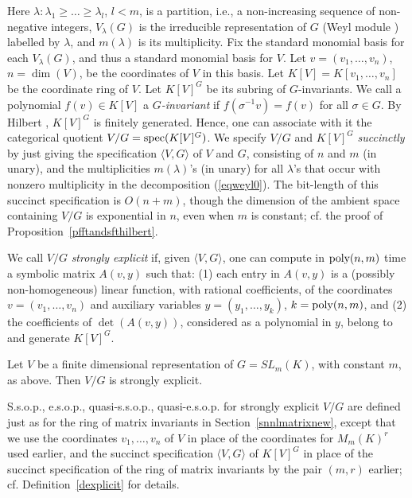 \documentclass[11pt]{article}
\begin{document}
Here $\lambda:\lambda_1 \ge \ldots \ge \lambda_l$, $l <m$, is a partition, i.e., a 
non-increasing sequence
of non-negative integers,  $V_\lambda(G)$ is the irreducible representation of $G$
(Weyl module \cite{fultonrepr}) labelled by $\lambda$, and $m(\lambda)$ is its multiplicity.
Fix the  standard monomial basis \cite{doubillet,raghavan} for each $V_\lambda(G)$, and thus a standard monomial basis for $V$.
Let $v=(v_1,\ldots,v_n)$, $n=\dim(V)$,  be the coordinates of $V$ in this basis. 
Let $K[V]=K[v_1,\ldots,v_n]$ be the coordinate ring of $V$. Let  $K[V]^G$ be 
its  subring of $G$-invariants. We call a polynomial $f(v) \in K[V]$ a {\em $G$-invariant} if $f(\sigma^{-1} v)=f(v)$ 
for all $\sigma \in G$.  By Hilbert \cite{hilbert}, 
$K[V]^G$ is finitely generated. Hence, one can associate with it the  categorical quotient \cite{mumford}
$V/G={\mbox {spec}}(K[V]^G)$.
We specify  $V/G$ and $K[V]^G$  {\em succinctly} by just giving 
the specification $\langle V, G \rangle$ of $V$ and $G$, consisting of 
 $n$ and $m$  (in unary), and
the  multiplicities   $m(\lambda)$'s (in unary) for all $\lambda$'s  that occur with
nonzero multiplicity in the decomposition (\ref{eqweyl0}). The bit-length of this succinct specification  is $O(n+m)$, though the dimension of the ambient space containing $V/G$ is exponential in $n$, even when $m$ is constant; 
cf. the proof of  Proposition~\ref{pfftandsfthilbert}.

We call $V/G$  {\em strongly explicit} if, given $\langle V, G \rangle$, one can compute in ${\mbox {poly}}(n,m)$ time 
a symbolic matrix $A(v,y)$ such that: (1) each entry in $A(v,y)$ is a (possibly non-homogeneous)  linear function, with rational coefficients,
of  the coordinates $v=(v_1,\ldots,v_n)$ and auxiliary variables $y=(y_1,\ldots,y_k)$,
$k={\mbox {poly}}(n,m)$, and  (2) the coefficients of
$\det(A(v,y))$, considered  as a polynomial in $y$, 
belong to and generate $K[V]^G$.

\begin{theorem} \label{tintroexplicitconstantnew}
Let  $V$  be  a finite dimensional representation of $G=SL_m(K)$,  with constant $m$, as above.
Then  $V/G$ is strongly explicit.
\end{theorem}

S.s.o.p., e.s.o.p., quasi-s.s.o.p., quasi-e.s.o.p.  for strongly explicit $V/G$ are
defined just as for the ring of matrix invariants in Section~\ref{snnlmatrixnew}, 
except that we use the coordinates $v_1,\ldots,v_n$ of
$V$ in place of the  coordinates for $M_m(K)^r$ used earlier, and the succinct specification 
$\langle V, G\rangle$ of $K[V]^G$ in 
place of the succinct specification of the ring of matrix invariants  by the pair $(m,r)$ earlier; cf. Definition~\ref{dexplicit} for details.
\end{document}
